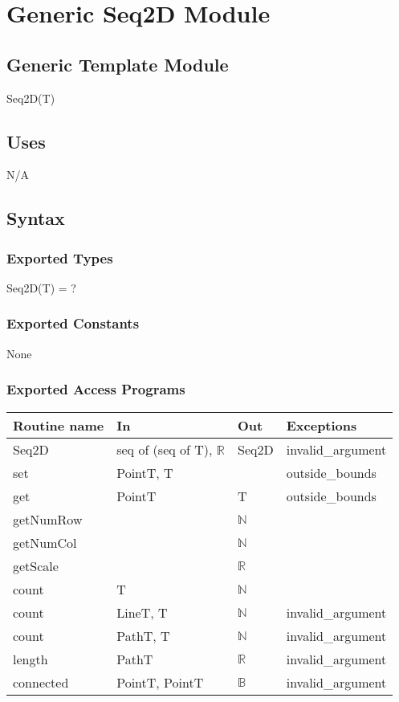 \documentclass[12pt]{article}
\begin{document}
\newpage

\section* {Generic Seq2D Module}

\subsection* {Generic Template Module}

Seq2D(T)

\subsection* {Uses}

N/A

\subsection* {Syntax}

\subsubsection* {Exported Types}

Seq2D(T) = ?

\subsubsection* {Exported Constants}

None

\subsubsection* {Exported Access Programs}

\begin{tabular}{| l | l | l | p{5cm} |}
\hline
\textbf{Routine name} & \textbf{In} & \textbf{Out} & \textbf{Exceptions}\\
\hline
Seq2D & seq of (seq of T), $\mathbb{R}$ & Seq2D & invalid\_argument\\
\hline
set & PointT, T & ~ & outside\_bounds\\
\hline
get & PointT & T & outside\_bounds\\
\hline
getNumRow & ~ & $\mathbb{N}$ & \\
\hline
getNumCol & ~ & $\mathbb{N}$ & \\
\hline
getScale & ~ & $\mathbb{R}$ & \\
\hline
count & T & $\mathbb{N}$ & \\
\hline
count & LineT, T & $\mathbb{N}$ & invalid\_argument\\
\hline
count & PathT, T & $\mathbb{N}$ & invalid\_argument\\
\hline
length & PathT & $\mathbb{R}$ & invalid\_argument\\
\hline
connected & PointT, PointT & $\mathbb{B}$ & invalid\_argument\\
\hline
\end{tabular}
\end{document}
